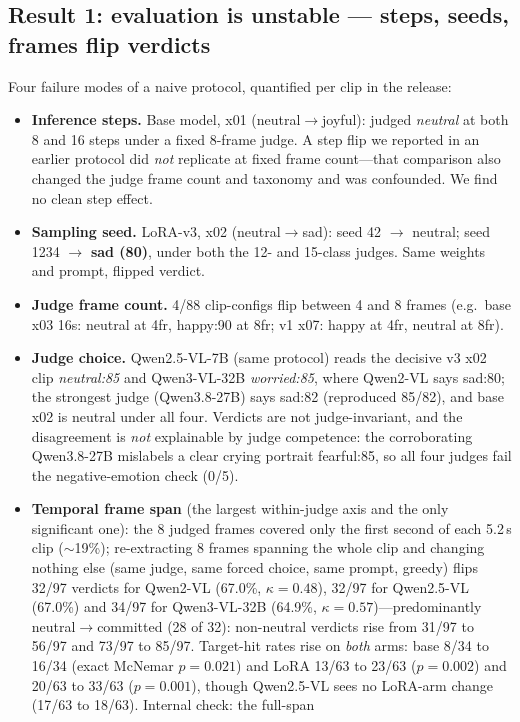\documentclass[conference]{IEEEtran}
\begin{document}
\subsection{Result 1: evaluation is unstable --- steps, seeds, frames flip verdicts}
Four failure modes of a naive protocol, quantified per clip in the release:
\begin{itemize}
\item \textbf{Inference steps.} Base model, x01 (neutral$\rightarrow$joyful): judged \emph{neutral}
at both 8 and 16 steps under a fixed 8-frame judge. A step flip we reported in an earlier protocol
did \emph{not} replicate at fixed frame count---that comparison also changed the judge frame count
and taxonomy and was confounded. We find no clean step effect.
\item \textbf{Sampling seed.} LoRA-v3, x02 (neutral$\rightarrow$sad): seed 42
$\rightarrow$ neutral; seed 1234 $\rightarrow$ \textbf{sad (80)}, under both the 12- and 15-class
judges. Same weights and prompt, flipped verdict.
\item \textbf{Judge frame count.} 4/88 clip-configs flip between 4 and 8 frames (e.g.\ base
x03 16s: neutral at 4fr, happy:90 at 8fr; v1 x07: happy at 4fr, neutral at 8fr).
\item \textbf{Judge choice.} Qwen2.5-VL-7B (same protocol) reads the decisive v3 x02 clip
\emph{neutral:85} and Qwen3-VL-32B \emph{worried:85}, where Qwen2-VL says sad:80; the strongest
judge (Qwen3.8-27B) says sad:82 (reproduced 85/82), and base x02 is neutral under all four. Verdicts
are not judge-invariant, and the disagreement is \emph{not} explainable by judge competence: the
corroborating Qwen3.8-27B mislabels a clear crying portrait fearful:85, so all four judges fail the
negative-emotion check (0/5).
\item \textbf{Temporal frame span} (the largest within-judge axis and the only significant one): the 8
judged frames covered only the first second of each 5.2\,s clip ($\sim$19\%); re-extracting 8 frames
spanning the whole clip and changing nothing else (same judge, same forced choice, same prompt, greedy)
flips 32/97 verdicts for Qwen2-VL (67.0\%, $\kappa{=}0.48$), 32/97 for Qwen2.5-VL (67.0\%) and 34/97 for
Qwen3-VL-32B (64.9\%, $\kappa{=}0.57$)---predominantly neutral$\rightarrow$committed (28 of 32): non-neutral
verdicts rise from 31/97 to 56/97 and 73/97 to 85/97. Target-hit rates rise on \emph{both} arms: base 8/34
to 16/34 (exact McNemar $p{=}0.021$) and LoRA 13/63 to 23/63 ($p{=}0.002$) and 20/63 to 33/63
($p{=}0.001$), though Qwen2.5-VL sees no LoRA-arm change (17/63 to 18/63). Internal check: the full-span

\end{itemize}
\end{document}
